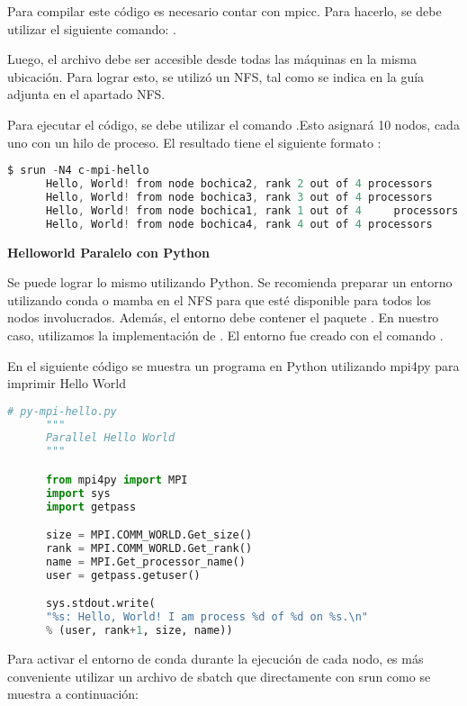 \begin{spacing}{1.5}
  Para compilar este código es necesario contar con mpicc. Para hacerlo, se
  debe utilizar el siguiente comando: .

  Luego, el archivo debe ser accesible desde todas las máquinas en la misma
  ubicación. Para lograr esto, se utilizó un NFS, tal como se indica en la guía
  adjunta en el apartado NFS.

  Para ejecutar el código, se debe utilizar el comando .Esto asignará 10 nodos, cada uno con un hilo de proceso. El resultado tiene el siguiente formato :

    \begin{lstlisting}[language=C]
      $ srun -N4 c-mpi-hello
      Hello, World! from node bochica2, rank 2 out of 4 processors
      Hello, World! from node bochica3, rank 3 out of 4 processors
      Hello, World! from node bochica1, rank 1 out of 4     processors
      Hello, World! from node bochica4, rank 4 out of 4 processors
    \end{lstlisting}

  \textbf{Helloworld Paralelo con Python}

  Se puede lograr lo mismo utilizando Python. Se recomienda preparar un
  entorno utilizando conda o mamba en el NFS para que esté disponible para
  todos
  los nodos involucrados. Además, el entorno debe contener el paquete
  . En nuestro caso, utilizamos la implementación de .
  El entorno fue creado con el comando .

    En el siguiente código se muestra un programa en Python utilizando mpi4py para imprimir Hello World

    \begin{lstlisting}[language=python]
      # py-mpi-hello.py
      """
      Parallel Hello World
      """

      from mpi4py import MPI
      import sys
      import getpass

      size = MPI.COMM_WORLD.Get_size()
      rank = MPI.COMM_WORLD.Get_rank()
      name = MPI.Get_processor_name()
      user = getpass.getuser()

      sys.stdout.write(
      "%s: Hello, World! I am process %d of %d on %s.\n"
      % (user, rank+1, size, name))

    \end{lstlisting}
      
    Para activar el entorno de conda durante la ejecución de cada nodo, es más conveniente utilizar un archivo de sbatch que directamente con srun como se muestra a continuación:


\end{spacing}
